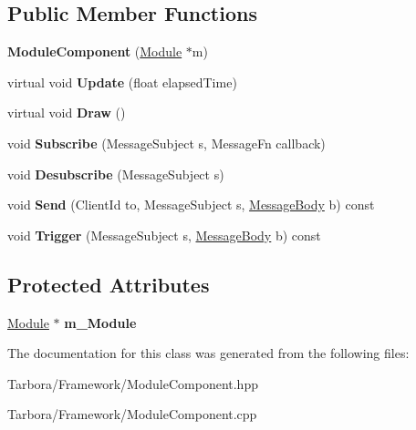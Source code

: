 \subsection*{Public Member Functions}
\begin{DoxyCompactItemize}
\item 
\mbox{\label{classTarbora_1_1ModuleComponent_abf895d50857190a19b6879aeecc21668}} 
{\bfseries Module\+Component} (\hyperlink{classTarbora_1_1Module}{Module} $\ast$m)
\item 
\mbox{\label{classTarbora_1_1ModuleComponent_a21c1768227e452b900ff45f41e6844ba}} 
virtual void {\bfseries Update} (float elapsed\+Time)
\item 
\mbox{\label{classTarbora_1_1ModuleComponent_a3e0caf8fa0129287828d3b3815988b61}} 
virtual void {\bfseries Draw} ()
\item 
\mbox{\label{classTarbora_1_1ModuleComponent_aae3c80099a0f7c93e63fe742a0afae24}} 
void {\bfseries Subscribe} (Message\+Subject s, Message\+Fn callback)
\item 
\mbox{\label{classTarbora_1_1ModuleComponent_a1a46dcc87cd8915d3c6bd797979e3e53}} 
void {\bfseries Desubscribe} (Message\+Subject s)
\item 
\mbox{\label{classTarbora_1_1ModuleComponent_a2c56f125eb1969a5cb622f71382aed43}} 
void {\bfseries Send} (Client\+Id to, Message\+Subject s, \hyperlink{classTarbora_1_1MessageBody}{Message\+Body} b) const
\item 
\mbox{\label{classTarbora_1_1ModuleComponent_ac2696ead558efb5461f82dea87852220}} 
void {\bfseries Trigger} (Message\+Subject s, \hyperlink{classTarbora_1_1MessageBody}{Message\+Body} b) const
\end{DoxyCompactItemize}
\subsection*{Protected Attributes}
\begin{DoxyCompactItemize}
\item 
\mbox{\label{classTarbora_1_1ModuleComponent_a909cc309bfeaa4fcef1b671f450cd7a7}} 
\hyperlink{classTarbora_1_1Module}{Module} $\ast$ {\bfseries m\+\_\+\+Module}
\end{DoxyCompactItemize}


The documentation for this class was generated from the following files\+:\begin{DoxyCompactItemize}
\item 
Tarbora/\+Framework/Module\+Component.\+hpp\item 
Tarbora/\+Framework/Module\+Component.\+cpp\end{DoxyCompactItemize}
